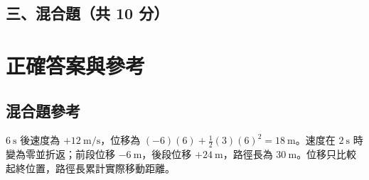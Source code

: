 \documentclass[10pt,a4paper]{article}
\begin{document}
\subsection*{三、混合題（共 10 分）}
\newpage\section*{正確答案與參考}\begin{center}\end{center}
\subsection*{混合題參考}$6\ \mathrm{s}$ 後速度為 $+12\ \mathrm{m/s}$，位移為 $(-6)(6)+\frac12(3)(6)^2=18\ \mathrm{m}$。速度在 $2\ \mathrm{s}$ 時變為零並折返；前段位移 $-6\ \mathrm{m}$，後段位移 $+24\ \mathrm{m}$，路徑長為 $30\ \mathrm{m}$。位移只比較起終位置，路徑長累計實際移動距離。
\end{document}

